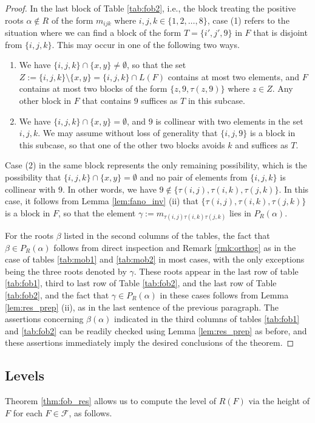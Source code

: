 \documentclass[10pt,a4paper]{amsart}
\numberwithin{equation}{section}
\newcommand{\al}{\alpha}
\newcommand{\be}{\beta}
\newcommand{\calf}{\mathcal{F}}
\newcommand{\pra}{P_R(\al)}
\begin{document}
\begin{proof}
In the last block of Table \ref{tab:fob2}, i.e., the block treating the positive
roots $\al\notin R$ of the form $m_{ijk}$ where $i,j,k\in \{1,2,\dots, 8\}$, case (1) refers to the situation
where we can find a block of the form $T=\{i',j',9\}$ in $F$ that is disjoint
from $\{i,j,k\}$. This may occur in one of the following two ways.
\begin{enumerate}
  \item We have $\{i,j,k\}\cap\{x,y\}\neq \emptyset$, so that the set
    $Z:=\{i,j,k\}\setminus\{x,y\}=\{i,j,k\}\cap L(F)$ contains at most two
    elements, and $F$
    contains at
    most two blocks of the form $\{z,9,\tau(z,9)\}$ where $z\in Z$. Any other
    block in $F$ that contains $9$ suffices as $T$ in this subcase.
  \item We have $\{i,j,k\}\cap \{x,y\}=\emptyset$, and $9$ is collinear with two
    elements in the set $i,j,k$. We may assume without loss of generality that
    $\{i,j,9\}$ is a block in this subcase, so that one of the other two blocks
    avoids $k$ and suffices as $T$.
\end{enumerate}
Case (2) in the same block represents the only remaining possibility, which is
the possibility that 
$\{i,j,k\}\cap \{x,y\}=\emptyset$ and no pair of elements from $\{i,j,k\}$ is
collinear with $9$. In other words, we have $9\notin
\{\tau(i,j),\tau(i,k),\tau(j,k)\}$. In this case, it follows from Lemma \ref{lem:fano_inv}
(ii) that $\{\tau(i,j),\tau(i,k),\tau(j,k)\}$ is a block in $F$, so that the
element $\gamma:=m_{\tau(i,j)\tau(i,k)\tau(j,k)}$ lies in $\pra$. 

For the roots $\be$ listed in the second columns of the tables, the fact that
$\be\in \pra$ follows from direct inspection and Remark \ref{rmk:orthog} as in
the case of tables \ref{tab:mob1} and \ref{tab:mob2} in most cases, with the only exceptions being the three
roots denoted by $\gamma$. These roots appear in the last row of table
\ref{tab:fob1}, third to last row of Table \ref{tab:fob2}, and the last row of
Table \ref{tab:fob2}, and the fact that $\gamma\in \pra$ in these cases follows
from Lemma \ref{lem:res_prep} (ii), as in the last sentence of the previous
paragraph. The assertions concerning $\be(\al)$ indicated in the third columns
of tables \ref{tab:fob1} and \ref{tab:fob2} can be readily checked using Lemma
\ref{lem:res_prep} as before, and these assertions immediately imply the desired
conclusions of the theorem. \end{proof}


\subsection{Levels}
\label{sec:fob_level}
Theorem \ref{thm:fob_res} allows us to compute the level of $R(F)$ via the height
of $F$ for each $F\in \calf$, as follows.
\end{document}
